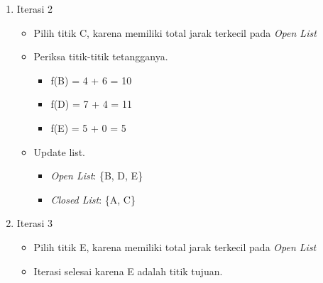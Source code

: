\begin{enumerate}
    \item Iterasi 2
    \begin{itemize}
        \item Pilih titik C, karena memiliki total jarak terkecil pada \textit{Open List}
        \item Periksa titik-titik tetangganya.
        \begin{itemize}
            \item f(B) = 4 + 6 = 10
            \item f(D) = 7 + 4 = 11
            \item f(E) = 5 + 0 = 5
        \end{itemize}
        \item Update list.
        \begin{itemize}
            \item \textit{Open List}: \{B, D, E\}
            \item \textit{Closed List}: \{A, C\}
        \end{itemize}
    \end{itemize}

    \item Iterasi 3
    \begin{itemize}
        \item Pilih titik E, karena memiliki total jarak terkecil pada \textit{Open List}
        \item Iterasi selesai karena E adalah titik tujuan.
    \end{itemize}
    
\end{enumerate}